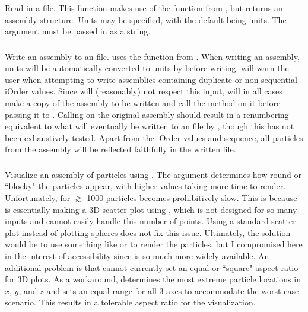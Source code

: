 \subsubsection{}
Read in a \pkd{}  file. This function makes use of the  function from , but returns an  assembly structure. Units may be specified, with the default being \pkd{} units. The  argument must be passed in as a string.

\subsubsection{}
Write an assembly to an  file.  uses the  function from . When writing an assembly, units will be automatically converted to \pkd{} units by  before writing.  will warn the user when attempting to write assemblies containing duplicate or non-sequential iOrder values. Since  will (reasonably) not respect this input,  will in all cases make a copy of the assembly to be written and call the  method on it before passing it to . Calling  on the original assembly should result in a renumbering equivalent to what will eventually be written to an  file by , though this has not been exhaustively tested. Apart from the iOrder values and sequence, all particles from the assembly will be reflected faithfully in the written  file.

\subsubsection{}
Visualize an assembly of particles using . The  argument determines how round or ``blocky" the particles appear, with higher values taking more time to render. Unfortunately, for $\gtrsim$ 1000 particles  becomes prohibitively slow. This is because  is essentially making a 3D scatter plot using , which is not designed for so many inputs and cannot easily handle this number of points. Using a standard scatter plot instead of plotting spheres does not fix this issue. Ultimately, the solution would be to use something like  or  to render the particles, but I compromised here in the interest of accessibility since  is so much more widely available. An additional problem is that  cannot currently set an equal or ``square" aspect ratio for 3D plots. As a workaround,  determines the most extreme particle locations in $x$, $y$, and $z$ and sets an equal range for all 3 axes to accommodate the worst case scenario. This results in a tolerable aspect ratio for the visualization.


